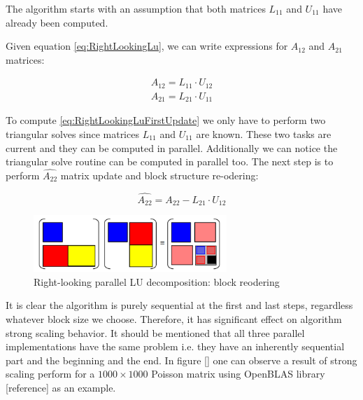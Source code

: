 The algorithm starts with an assumption that both matrices $L_{11}$ and $U_{11}$ have already been computed. 

Given equation \ref{eq:RightLookingLu}, we can write expressions for $A_{12}$ and $A_{21}$ matrices:

\begin{align} \label{eq:RightLookingLuFirstUpdate}
A_{12} = L_{11} \cdot U_{12} \\
A_{21} = L_{21} \cdot U_{11}
\end{align}

To compute \ref{eq:RightLookingLuFirstUpdate} we only have to perform two triangular solves since matrices $L_{11}$ and $U_{11}$ are known. These two tasks are current and they can be computed in parallel. Additionally we can notice the triangular solve routine can be computed in parallel too. The next step is to perform $\hat{A_{22}}$ matrix update and block structure re-odering:

\begin{equation} \label{eq:RightLookingLuSecondUpdate}
\hat{A_{22}} = A_{22} - L_{21} \cdot U_{12}
\end{equation}


\begin{figure}[htpb]
  \centering
  \includegraphics[width=0.65\textwidth]{figures/chapter-2/right-looking-reodering.png}
\caption{Right-looking parallel LU decomposition: block reodering \cite{netlib:lapack-scalapack-general-view}}
\label{fig:RightLookingLuReodering}
\end{figure}


It is clear the algorithm is purely sequential at the first and last steps, regardless whatever block size we choose. Therefore, it has significant effect on algorithm strong scaling behavior. It should be mentioned that all three parallel implementations have the same problem i.e. they have an inherently sequential part and the beginning and the end. In figure [] one can observe a result of strong scaling perform for a $1000 \times 1000$ Poisson matrix using OpenBLAS library [reference] as an example.


